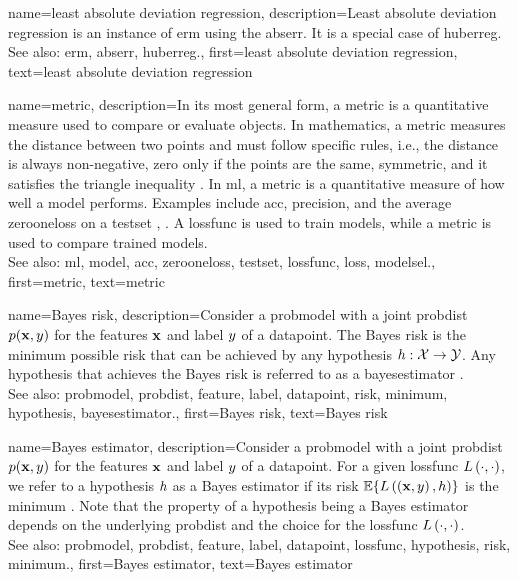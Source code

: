 {name={least absolute deviation regression},
	description={Least absolute deviation regression is 
		an instance of \gls{erm} using the \gls{abserr}. It is a special case of 
		\gls{huberreg}.
				\\
		See also: \gls{erm}, \gls{abserr}, \gls{huberreg}.},
	first={least absolute deviation regression},
	text={least absolute deviation regression}
}

{name={metric},
	description={In its most general form, a metric is a quantitative measure used to compare or evaluate objects. 
		In mathematics, a metric measures the distance between two points and must follow specific rules, i.e., 
		the distance is always non-negative, zero only if the points are the same, symmetric, and it satisfies the 
		triangle inequality \cite{RudinBookPrinciplesMatheAnalysis}. In \gls{ml}, a metric is a quantitative measure 
		of how well a \gls{model} performs. Examples include \gls{acc}, precision, and the average \gls{zerooneloss} 
		on a \gls{testset} \cite{Goodfellow-et-al-2016}, \cite{BishopBook}. A \gls{lossfunc} is used to train \glspl{model}, 
		while a metric is used to compare trained \glspl{model}.
		\\ 
		See also: \gls{ml}, \gls{model}, \gls{acc}, \gls{zerooneloss}, \gls{testset}, \gls{lossfunc}, \gls{loss}, \gls{modelsel}.},
	first={metric}, 
	text={metric}
}

{name={Bayes risk},
	description={Consider a \gls{probmodel} with a 
		joint \gls{probdist} $p({\bf x},y)$ for the \glspl{feature} ${\bf x}$ 
		and \gls{label} $y$ of a \gls{datapoint}. The Bayes \gls{risk} 
		is the \gls{minimum} possible \gls{risk} that can be achieved by any \gls{hypothesis} 
		$h: \mathcal{X} \rightarrow \mathcal{Y}$. Any \gls{hypothesis} that achieves 
		the Bayes \gls{risk} is referred to as a \gls{bayesestimator} \cite{LC}.
		\\
		See also: \gls{probmodel}, \gls{probdist}, \gls{feature}, \gls{label}, \gls{datapoint}, \gls{risk}, \gls{minimum}, \gls{hypothesis}, \gls{bayesestimator}.},
	first={Bayes risk},
	text={Bayes risk}
}
	
{name={Bayes estimator},
	description={Consider 
		a \gls{probmodel} with a joint \gls{probdist} $p({\bf x},y)$ for the \glspl{feature} ${\bf x}$ and \gls{label} 
		$y$ of a \gls{datapoint}. For a given \gls{lossfunc} $L\left(\cdot,\cdot \right)$, we refer to a \gls{hypothesis} 
		$h$ as a Bayes estimator if its \gls{risk} $\mathbb{E}\{L\left(\left( {\bf x},y \right),h \right)\}$ is the 
		\gls{minimum} \cite{LC}. Note that the property of a \gls{hypothesis} being a Bayes estimator depends on 
		the underlying \gls{probdist} and the choice for the \gls{lossfunc} $L\left(\cdot,\cdot \right)$.
		\\
		See also: \gls{probmodel}, \gls{probdist}, \gls{feature}, \gls{label}, \gls{datapoint}, \gls{lossfunc}, \gls{hypothesis}, \gls{risk}, \gls{minimum}.},
	first={Bayes estimator},
	text={Bayes estimator}
}


